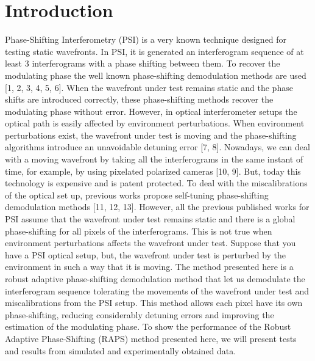 \section{Introduction}
Phase-Shifting Interferometry (PSI) is a very known technique designed for
testing static wavefronts. In PSI, it is generated an interferogram sequence of
at least 3 interferograms with a phase shifting between them. To recover the
modulating phase the well known phase-shifting demodulation methods are used [1,
2, 3, 4, 5, 6]. When the wavefront under test remains static and the phase
shifts are introduced correctly, these phase-shifting methods recover the
modulating phase without error. However, in optical interferometer setups the
optical path is easily affected by environment perturbations. When environment
perturbations exist, the wavefront under test is moving and the phase-shifting
algorithms introduce an unavoidable detuning error [7, 8]. Nowadays, we can deal
with a moving wavefront by taking all the interferograms in the same instant of
time, for example, by using pixelated polarized cameras [10, 9]. But, today this
technology is expensive and is patent protected. To deal with the
miscalibrations of the optical set up, previous works propose self-tuning
phase-shifting demodulation methods [11, 12, 13]. However, all the previous
published works for PSI assume that the wavefront under test remains static and
there is a global phase-shifting for all pixels of the interferograms. This is
not true when environment perturbations affects the wavefront under test.
Suppose that you have a PSI optical setup, but, the wavefront under test is
perturbed by the environment in such a way that it is moving. The method
presented here is a robust adaptive phase-shifting demodulation method that let
us demodulate the interferogram sequence tolerating the movements of the
wavefront under test and miscalibrations from the PSI setup. This method allows
each pixel have its own phase-shifting, reducing considerably detuning errors
and improving the estimation of the modulating phase. To show the performance of
the Robust Adaptive Phase-Shifting (RAPS) method presented here, we will present
tests and results from simulated and experimentally obtained data.

